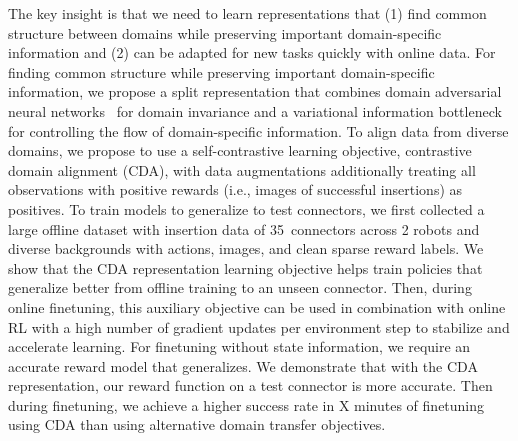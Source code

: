 \documentclass{article}
\newcommand{\numconnectors}{35}
\begin{document}
The key insight is that we need to learn representations that (1) find common structure between domains while preserving important domain-specific information and (2) can be adapted for new tasks quickly with online data.
For finding common structure while preserving important domain-specific information, we propose a split representation that combines domain adversarial neural networks~\cite{ganin2016domainadversarial} for domain invariance and a variational information bottleneck~\cite{alemi2017vib}
for controlling the flow of domain-specific information.
To align data from diverse domains, we propose to use a self-contrastive learning objective, contrastive domain alignment (CDA),
with data augmentations additionally treating all observations with positive rewards (i.e., images of successful insertions) as positives.
To train models to generalize to test connectors, we first collected a large offline dataset with insertion data of \numconnectors~connectors across 2 robots and diverse backgrounds with actions, images, and clean sparse reward labels.
We show that the CDA representation learning objective helps train policies that generalize better from offline training to an unseen connector. 
Then, during online finetuning, this auxiliary objective can be used in combination with online RL with a high number of gradient updates per environment step to stabilize and accelerate learning.
For finetuning without state information, we require an accurate reward model that generalizes.
We demonstrate that with the CDA representation, our reward function on a test connector is more accurate.
Then during finetuning, we achieve a higher success rate in X minutes of finetuning using CDA than using alternative domain transfer objectives.
\end{document}
